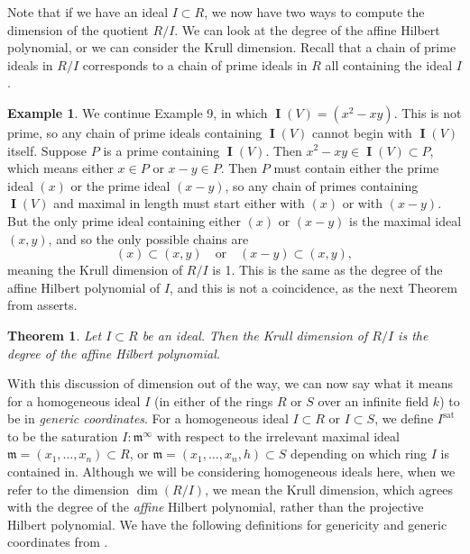 \documentclass[11pt]{article}
\newcommand{\sat}{^{\text{sat}}}
\DeclareMathOperator{\I}{\mathbf{I}}
\newtheorem{theorem}{Theorem}
\theoremstyle{definition}
\newtheorem{example}{Example}
\begin{document}
Note that if we have an ideal $I \subset R$, we now have two ways to compute the dimension of the quotient $R/I$. We can look at the degree of the affine Hilbert polynomial, or we can consider the Krull dimension. Recall that a chain of prime ideals in $R/I$ corresponds to a chain of prime ideals in $R$ all containing the ideal $I$. 


\begin{example}
	We continue Example 9, in which $\I(V) = (x^2 - xy)$. This is not prime, so any chain of prime ideals containing $\I(V)$ cannot begin with $\I(V)$ itself. Suppose $P$ is a prime containing $\I(V)$. Then $x^2 - xy \in \I(V) \subset P$, which means either $x \in P$ or $x - y \in P$. Then $P$ must contain either the prime ideal $(x)$ or the prime ideal $(x - y)$, so any chain of primes containing $\I(V)$ and maximal in length must start either with $(x)$ or with $(x - y)$. But the only prime ideal containing either $(x)$ or $(x - y)$ is the maximal ideal $(x,y)$, and so the only possible chains are \[ (x) \subset (x,y) \quad \text{or} \quad (x - y) \subset (x,y), \] meaning the Krull dimension of $R/I$ is 1. This is the same as the degree of the affine Hilbert polynomial of $I$, and this is not a coincidence, as the next Theorem from \cite{kemper2011course} asserts. 
\end{example}


\begin{theorem}
	Let $I \subset R$ be an ideal. Then the Krull dimension of $R/I$ is the degree of the affine Hilbert polynomial. 
\end{theorem}


With this discussion of dimension out of the way, we can now say what it means for a homogeneous ideal $I$ (in either of the rings $R$ or $S$ over an infinite field $k$) to be in \emph{generic coordinates}. For a homogeneous ideal $I \subset R$ or $I \subset S$, we define $I\sat$ to be the saturation $I:\mathfrak{m}^\infty$ with respect to the irrelevant maximal ideal $\mathfrak{m} = (x_1, \dots, x_n) \subset R$, or $\mathfrak{m} = (x_1, \dots, x_n, h) \subset S$ depending on which ring $I$ is contained in. Although we will be considering homogeneous ideals here, when we refer to the dimension $\dim(R/I)$, we mean the Krull dimension, which agrees with the degree of the \emph{affine} Hilbert polynomial, rather than the projective Hilbert polynomial. We have the following definitions for genericity and generic coordinates from \cite{bayer1987criterion}. 
\end{document}
